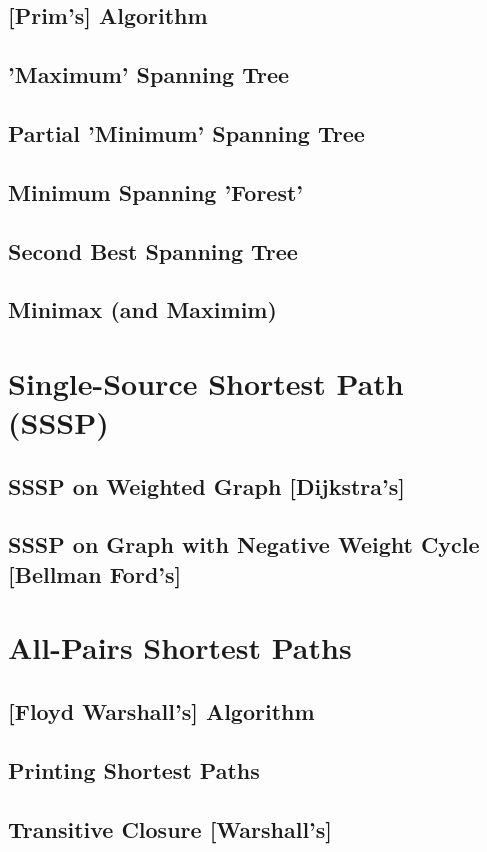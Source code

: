 	\subsection {[Prim's] Algorithm}
	\subsection {'Maximum' Spanning Tree}
	\subsection {Partial 'Minimum' Spanning Tree}
	\subsection {Minimum Spanning 'Forest'}
	\subsection {Second Best Spanning Tree}
	\subsection {Minimax (and Maximim)}
\section {Single-Source Shortest Path (SSSP)}
	\subsection {SSSP on Weighted Graph [Dijkstra's]}
	\subsection {SSSP on Graph with Negative Weight Cycle [Bellman Ford's]}
\section {All-Pairs Shortest Paths}
	\subsection {[Floyd Warshall's] Algorithm}
	\subsection {Printing Shortest Paths}
	\subsection {Transitive Closure [Warshall's]}
